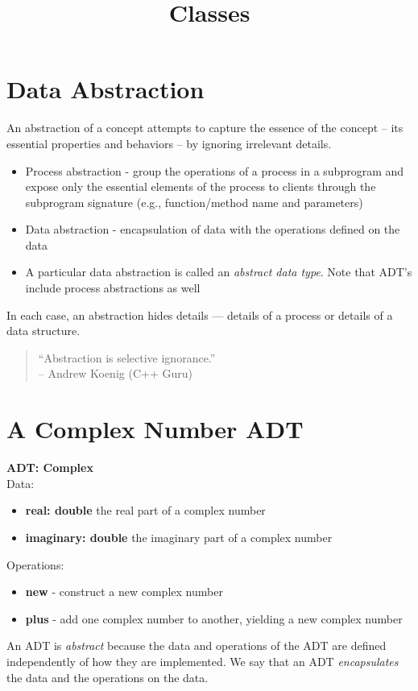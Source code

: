 \documentclass{article}
\title{Classes}
\date{}
\begin{document}
\maketitle

\section{Data Abstraction}


An abstraction of a concept attempts to capture the essence of the concept -- its essential properties and behaviors -- by ignoring irrelevant details.
\begin{itemize}
\item Process abstraction - group the operations of a process in a subprogram and expose only the essential elements of the process to clients through the subprogram signature (e.g., function/method name and parameters)
\item Data abstraction - encapsulation of data with the operations defined on the data
\item A particular data abstraction is called an {\em abstract data type}.  Note that ADT's include process abstractions as well
\end{itemize}

In each case, an abstraction hides details --- details of a process or details of a data structure.

\begin{quote}
``Abstraction is selective ignorance.''\\
-- Andrew Koenig (C++ Guru)
\end{quote}


\section{A Complex Number ADT}


{\bf ADT: Complex}\\
Data:
\begin{itemize}
\item {\bf real: double} the real part of a complex number
\item {\bf imaginary: double} the imaginary part of a complex number
\end{itemize}
Operations:
\begin{itemize}
\item {\bf new} - construct a new complex number
\item {\bf plus} - add one complex number to another, yielding a new complex number
\end{itemize}
An ADT is {\it abstract} because the data and operations of the ADT are defined independently of how they are implemented.  We say that an ADT {\it encapsulates} the data and the operations on the data.
\end{document}
